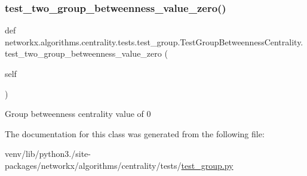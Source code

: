 \subsubsection{\texorpdfstring{test\+\_\+two\+\_\+group\+\_\+betweenness\+\_\+value\+\_\+zero()}{test\_two\_group\_betweenness\_value\_zero()}}
{\footnotesize\ttfamily def networkx.\+algorithms.\+centrality.\+tests.\+test\+\_\+group.\+Test\+Group\+Betweenness\+Centrality.\+test\+\_\+two\+\_\+group\+\_\+betweenness\+\_\+value\+\_\+zero (\begin{DoxyParamCaption}\item[{}]{self }\end{DoxyParamCaption})}

\begin{DoxyVerb}Group betweenness centrality value of 0
\end{DoxyVerb}
 

The documentation for this class was generated from the following file\+:\begin{DoxyCompactItemize}
\item 
venv/lib/python3./site-\/packages/networkx/algorithms/centrality/tests/\hyperlink{test__group_8py}{test\+\_\+group.\+py}\end{DoxyCompactItemize}
